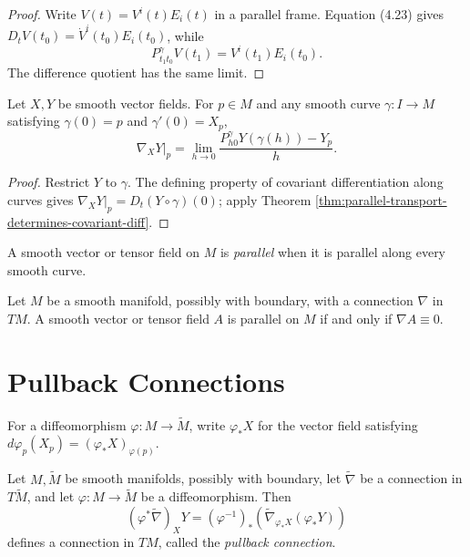 \begin{proof}
\sketch Write $V(t)=V^i(t)E_i(t)$ in a parallel frame. Equation (4.23) gives
$D_tV(t_0)=\dot V^i(t_0)E_i(t_0)$, while
\[
P_{t_1t_0}^\gamma V(t_1)=V^i(t_1)E_i(t_0).
\]
The difference quotient has the same limit.
\end{proof}

\begin{corollary}
\label{cor:parallel-transport-determines-connection}

Let $X,Y$ be smooth vector fields. For $p\in M$ and any smooth curve
$\gamma\colon I\to M$ satisfying $\gamma(0)=p$ and $\gamma'(0)=X_p$,
\begin{equation}
\nabla_XY|_p=\lim_{h\to0}
\frac{P_{h0}^\gamma Y(\gamma(h))-Y_p}{h}. \tag{4.25}
\end{equation}
\end{corollary}

\begin{proof}
\sketch Restrict $Y$ to $\gamma$. The defining property of covariant
differentiation along curves gives $\nabla_XY|_p=D_t(Y\circ\gamma)(0)$; apply
Theorem \ref{thm:parallel-transport-determines-covariant-diff}.
\end{proof}

A smooth vector or tensor field on $M$ is \emph{parallel} when it is parallel
along every smooth curve.

\begin{proposition}
\label{prop:parallel-field-characterization}
Let $M$ be a smooth manifold, possibly with boundary, with a connection $\nabla$
in $TM$. A smooth vector or tensor field $A$ is parallel on $M$ if and only if
$\nabla A\equiv0$.
\end{proposition}

\section{Pullback Connections}

For a diffeomorphism $\varphi\colon M\to\widetilde M$, write $\varphi_*X$ for
the vector field satisfying
$d\varphi_p(X_p)=(\varphi_*X)_{\varphi(p)}$.

\begin{lemma}
\label{lem:pullback-connection}





Let $M,\widetilde M$ be smooth manifolds, possibly with boundary, let
$\widetilde\nabla$ be a connection in $T\widetilde M$, and let
$\varphi\colon M\to\widetilde M$ be a diffeomorphism. Then
\begin{equation}
(\varphi^*\widetilde\nabla)_XY
=(\varphi^{-1})_*
\left(\widetilde\nabla_{\varphi_*X}(\varphi_*Y)\right) \tag{4.26}
\end{equation}
defines a connection in $TM$, called the \emph{pullback connection}.
\end{lemma}

